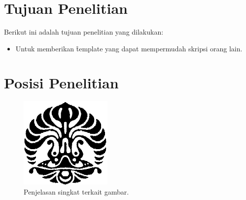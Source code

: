 \section{Tujuan Penelitian}
\label{sec:tujuan}
Berikut ini adalah tujuan penelitian yang dilakukan:
\begin{itemize}
	\item Untuk memberikan \f{template} yang dapat mempermudah skripsi orang lain.
\end{itemize}


\section{Posisi Penelitian}
\label{sec:posisiPenelitian}

\begin{figure}
	\centering
	\includegraphics[width=0.4\textwidth]{pics/makara.png}
	\caption{Penjelasan singkat terkait gambar.}
	\label{fig:research_position}
\end{figure}



